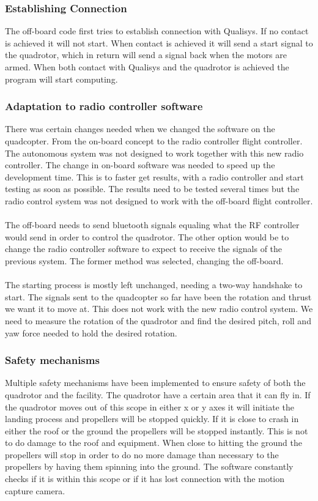 \subsubsection{Establishing Connection}
The off-board code first tries to establish connection with Qualisys. If no contact is achieved it will not start. When contact is achieved it will send a start signal to the quadrotor, which in return will send a signal back when the motors are armed. When both contact with Qualisys and the quadrotor is achieved the program will start computing. \\
\subsubsection{Adaptation to radio controller software}
There was certain changes needed when we changed the software on the quadcopter. From the on-board concept to the radio controller flight controller. The autonomous system was not designed to work together with this new radio controller. The change in on-board software was needed to speed up the development time. This is to faster get results, with a radio controller and start testing as soon as possible. The results need to be tested several times but the radio control system was not designed to work with the off-board flight controller. \\
\\
The off-board needs to send bluetooth signals equaling what the RF controller would send in order to control the quadrotor. The other option would be to change the radio controller software to expect to receive the signals of the previous system. The former method was selected, changing the off-board. \\
\\
The starting process is mostly left unchanged, needing a two-way handshake to start. The signals sent to the quadcopter so far have been the rotation and thrust we want it to move at. This does not work with the new radio control system. We need to measure the rotation of the quadrotor and find the desired pitch, roll and yaw force needed to hold the desired rotation. 

\subsubsection{Safety mechanisms}
Multiple safety mechanisms have been implemented to ensure safety of both the quadrotor and the facility. The quadrotor have a certain area that it can fly in.  If the quadrotor moves out of this scope in either x or y axes it will initiate the landing process and propellers will be stopped quickly. If it is close to crash in either the roof or the ground the propellers will be stopped instantly. This is not to do damage to the roof and equipment. When close to hitting the ground the propellers will stop in order to do no more damage than necessary to the propellers by having them spinning into the ground. The software constantly checks if it is within this scope or if it has lost connection with the motion capture camera. 
